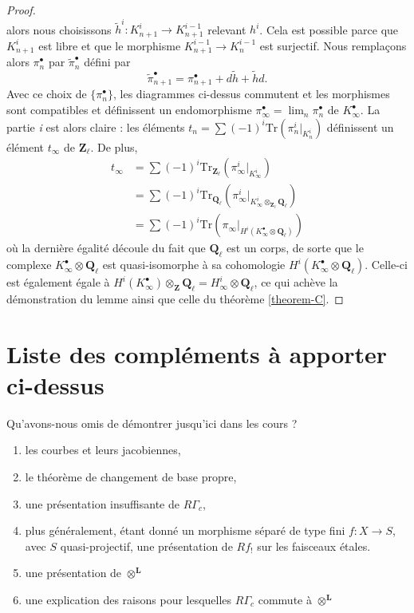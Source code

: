 \begin{proof}
$$$$
alors nous choisissons $\tilde h^i : K_{n+1}^i\to K_{n+1}^{i-1}$ relevant $h^i$. Cela est
possible parce que $K_{n+1}^i$ est libre et que le morphisme $K_{n+1}^{i-1}\to K_n^{i-1}$ est
surjectif. Nous remplaçons alors $\pi_n^\bullet$ par $\tilde\pi_n^\bullet$ défini par
$$
\tilde\pi_{n+1}^\bullet = \pi_{n+1}^\bullet + d\tilde h+\tilde hd.
$$
Avec ce choix de $\{\pi_n^\bullet\}$, les diagrammes ci-dessus commutent et les
morphismes sont compatibles et définissent un endomorphisme $\pi_\infty^\bullet =
\lim_n\pi_n^\bullet$ de $K_\infty^\bullet$. La partie {\it i} est alors claire :
les éléments $t_n = \sum(-1)^i \text{Tr}\left(\pi_n^i |_{K_n^i}\right)$
définissent un élément $t_\infty$ de $\mathbf{Z}_\ell$. De plus,
\begin{align*}
t_\infty
& =
\sum (-1)^i \text{Tr}_{\mathbf{Z}_\ell}(\pi_\infty^i |_{K_\infty^i}) \\
& =
\sum (-1)^i \text{Tr}_{\mathbf{Q}_\ell}(
\pi_\infty^i |_{K_\infty^i \otimes_{\mathbf{Z}_\ell}\mathbf{Q}_\ell}) \\
& =
\sum (-1)^i \text{Tr}(
\pi_\infty |_{H^i(K_\infty^\bullet \otimes \mathbf{Q}_\ell)})
\end{align*}
où la dernière égalité découle du fait que $\mathbf{Q}_\ell$ est un
corps, de sorte que le complexe $K_\infty^\bullet \otimes \mathbf{Q}_\ell$ est
quasi-isomorphe à sa cohomologie
$H^i(K_\infty^\bullet \otimes \mathbf{Q}_\ell)$. Celle-ci est également égale à
$H^i(K_\infty^\bullet)\otimes_{\mathbf{Z}}\mathbf{Q}_\ell = H_\infty^i \otimes
\mathbf{Q}_\ell$, ce qui achève la démonstration du lemme ainsi que celle du
théorème \ref{theorem-C}.
\end{proof}




\section{Liste des compléments à apporter ci-dessus}
\label{section-list-skipped}

\noindent
Qu'avons-nous omis de démontrer jusqu'ici dans les cours ?
\begin{enumerate}
\item les courbes et leurs jacobiennes,
\item le théorème de changement de base propre,
\item une présentation insuffisante de $R\Gamma_c$,
\item plus généralement, étant donné un morphisme séparé de type fini $f : X \to S$,
avec $S$ quasi-projectif, une présentation de $Rf_!$ sur les faisceaux \'etales.
\item une présentation de $\otimes^{\mathbf{L}}$
\item une explication des raisons pour lesquelles $R\Gamma_c$ commute à $\otimes^{\mathbf{L}}$
\end{enumerate}






